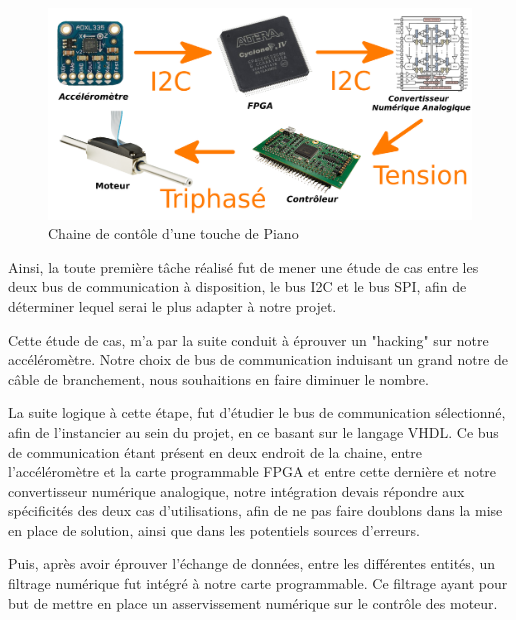 \documentclass[french,a4paper,12pt]{report}
\begin{document}
	\begin{figure}[!ht]
    \center
  	\includegraphics[width=17cm]{CH.png}
    \caption{Chaine de contôle d'une touche de Piano}
		\end{figure}
	
	
	
	Ainsi, la toute première tâche réalisé fut de mener une étude de cas entre les deux bus de communication à disposition, le bus I2C et le bus SPI, afin de déterminer lequel serai le plus adapter à notre projet.
	
	Cette étude de cas, m'a par la suite conduit à éprouver un "hacking" sur notre accéléromètre. Notre choix de bus de communication induisant un grand notre de câble de branchement, nous souhaitions en faire diminuer le nombre.
	
	La suite logique à cette étape, fut d'étudier le bus de communication sélectionné, afin de l'instancier au sein du projet, en ce basant sur le langage VHDL. Ce bus de communication étant présent en deux endroit de la chaine, entre l'accéléromètre et la carte programmable FPGA et entre cette dernière et notre convertisseur numérique analogique, notre intégration devais répondre aux spécificités des deux cas d'utilisations, afin de ne pas faire doublons dans la mise en place de solution, ainsi que dans les potentiels sources d'erreurs.
	
	Puis, après avoir éprouver l'échange de données, entre les différentes entités, un filtrage numérique fut intégré à notre carte programmable. Ce filtrage ayant pour but de mettre en place un asservissement numérique sur le contrôle des moteur.
	
\end{document}
